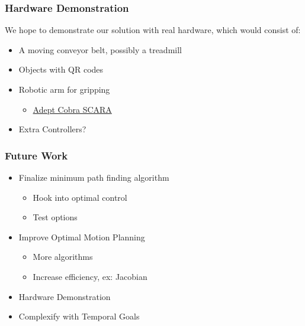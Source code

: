 \documentclass{beamer}
\begin{document}
\begin{frame}
\frametitle{Hardware Demonstration}
We hope to demonstrate our solution with real hardware, which would consist of:
\begin{itemize}
\item A moving conveyor belt, possibly a treadmill
\item Objects with QR codes
\item Robotic arm for gripping
	\begin{itemize}
	\item \href{http://www.youtube.com/watch?v=vKD20BTkXhk&t=0m16s}{{\color{blue} Adept Cobra SCARA}}
	\end{itemize}
\item Extra Controllers?
\end{itemize}

\end{frame}

\begin{frame}
\frametitle{Future Work}
\begin{itemize}
\item Finalize minimum path finding algorithm
	\begin{itemize}
	\item Hook into optimal control
	\item Test options
	\end{itemize}
\item Improve Optimal Motion Planning
	\begin{itemize}
	\item More algorithms
	\item Increase efficiency, ex: Jacobian
	\end{itemize}
\item Hardware Demonstration
\item Complexify with Temporal Goals
\end{itemize}

\end{frame}
\end{document}
